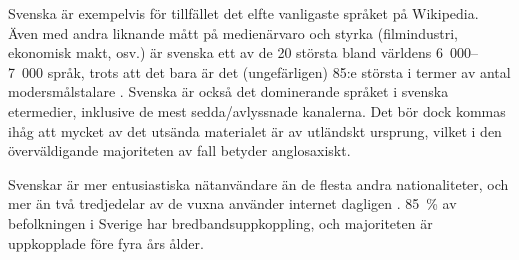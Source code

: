 \begin{multicols}{2}
Svenska är exempelvis för tillfället
det elfte vanligaste språket på Wikipedia. Även med andra liknande
mått på medienärvaro och styrka (filmindustri, ekonomisk makt, osv.)
är svenska ett av de 20 största bland världens 6~000--7~000 språk,
trots att det bara är det (ungefärligen) 85:e största i termer av
antal modersmålstalare \cite[55--64]{parkvall2006}. Svenska är också
det dominerande språket i svenska etermedier, inklusive de mest
sedda/avlyssnade kanalerna. Det bör dock kommas ihåg att mycket av det
utsända materialet är av utländskt ursprung, vilket i den
överväldigande majoriteten av fall betyder anglosaxiskt.

Svenskar är mer entusiastiska nätanvändare än de flesta andra
nationaliteter, och mer än två tredjedelar av de vuxna använder
internet dagligen \cite{findahl1}. 85~\% av befolkningen i Sverige har bredbandsuppkoppling, och
majoriteten är uppkopplade före fyra års ålder.

\end{multicols}

\clearpage



